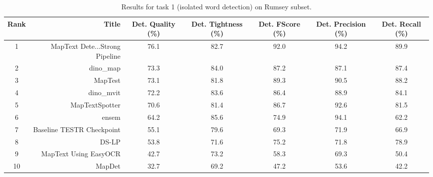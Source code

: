 \begin{table}
\caption{Results for task 1 (isolated word detection) on Rumsey subset.}
\begin{tabular}{crccccc}
\toprule
Rank & Title & Det. Quality (\%) & Det. Tightness (\%) & Det. FScore (\%) & Det. Precision (\%) & Det. Recall (\%) \\
\midrule
1 & MapText Dete...Strong Pipeline & 76.1 & 82.7 & 92.0 & 94.2 & 89.9 \\
2 & dino_map & 73.3 & 84.0 & 87.2 & 87.1 & 87.4 \\
3 & MapTest & 73.1 & 81.8 & 89.3 & 90.5 & 88.2 \\
4 & dino_mvit & 72.2 & 83.6 & 86.4 & 88.9 & 84.1 \\
5 & MapTextSpotter & 70.6 & 81.4 & 86.7 & 92.6 & 81.5 \\
6 & ensem & 64.2 & 85.6 & 74.9 & 94.1 & 62.2 \\
7 & Baseline TESTR Checkpoint & 55.1 & 79.6 & 69.3 & 71.9 & 66.9 \\
8 & DS-LP & 53.8 & 71.6 & 75.2 & 71.8 & 78.9 \\
9 & MapText Using EasyOCR & 42.7 & 73.2 & 58.3 & 69.3 & 50.4 \\
10 & MapDet & 32.7 & 69.2 & 47.2 & 53.6 & 42.2 \\
\bottomrule
\end{tabular}
\end{table}

